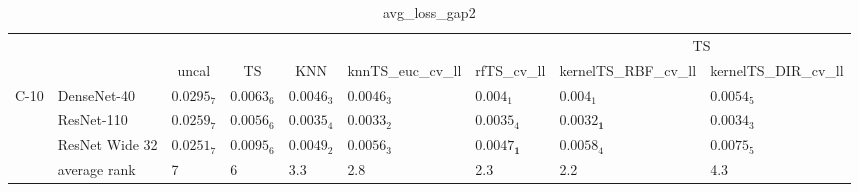 \begin{table*}
\caption{avg_loss_gap2}
\label{table:avg_loss_gap2}
\centering
\begin{adjustbox}{width=\textwidth}

\begin{tabular}{lllllllll}
\toprule
\multicolumn{7}{c}{}&\multicolumn{2}{c}{TS}\\
\cmidrule{8-9}
\multicolumn{1}{c}{}&\multicolumn{1}{c}{}&\multicolumn{1}{c}{uncal}&\multicolumn{1}{c}{TS}&\multicolumn{1}{c}{KNN}&\multicolumn{1}{c}{knnTS_euc_cv_ll}&\multicolumn{1}{c}{rfTS_cv_ll}&\multicolumn{1}{c}{kernelTS_RBF_cv_ll}&\multicolumn{1}{c}{kernelTS_DIR_cv_ll}\\\midrule
C-10 & DenseNet-40 &  $0.0295_{7}$ &  $0.0063_{6}$ &  $0.0046_{3}$ &    $0.0046_{3}$ &            $0.004_{1}$ &            $0.004_{1}$ &       $0.0054_{5}$ \\
     & ResNet-110 &  $0.0259_{7}$ &  $0.0056_{6}$ &  $0.0035_{4}$ &    $0.0033_{2}$ &           $0.0035_{4}$ &  $\mathbf{0.0032_{1}}$ &       $0.0034_{3}$ \\
     & ResNet Wide 32 &  $0.0251_{7}$ &  $0.0095_{6}$ &  $0.0049_{2}$ &    $0.0056_{3}$ &  $\mathbf{0.0047_{1}}$ &           $0.0058_{4}$ &       $0.0075_{5}$ \\
\cmidrule{2-9}
     & average rank &             7 &             6 &           3.3 &             2.8 &                    2.3 &                    2.2 &                4.3 \\
\cmidrule{1-9}
\bottomrule
\end{tabular}


\end{adjustbox}
\end{table*}